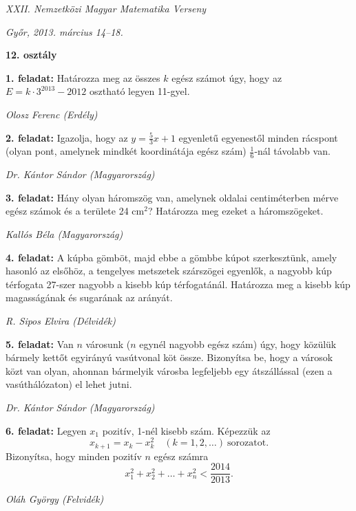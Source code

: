 \documentclass[a4paper,10pt]{article}
\newcommand{\ki}[2]{\hfill {\it #1 (#2)}\medskip}
\begin{document}
\begin{center} \Large {\em XXII. Nemzetközi Magyar Matematika Verseny} \end{center}
\begin{center} \large{\em Győr, 2013. március 14--18.} \end{center}
\smallskip
\begin{center} \large{\bf 12. osztály} \end{center}
\bigskip 

{\bf 1. feladat: } Határozza meg az összes $k$ egész számot úgy, hogy az $E = k\cdot 3^{2013}-2012$ osztható legyen 11-gyel.


\ki{Olosz Ferenc}{Erdély}\medskip

{\bf 2. feladat: } Igazolja, hogy az
$\displaystyle{y=\frac{5}{3}x+1}$
 egyenletű egyenestől minden rácspont (olyan pont, amelynek mindkét koordinátája egész szám) 
 $\displaystyle{\frac{1}{6}}$-nál távolabb van.


\ki{Dr. Kántor Sándor}{Magyarország}\medskip

{\bf 3. feladat: } Hány olyan háromszög van, amelynek oldalai centiméterben mérve egész számok és a
területe 24 cm$^2$? Határozza meg ezeket a háromszögeket.


\ki{Kallós Béla}{Magyarország}\medskip

{\bf 4. feladat: } A kúpba gömböt, majd ebbe a gömbbe kúpot szerkesztünk, amely hasonló az elsőhöz, a
tengelyes metszetek szárszögei egyenlők, a nagyobb kúp térfogata 27-szer nagyobb a
kisebb kúp térfogatánál. Határozza meg a kisebb kúp magasságának és sugarának az
arányát.


\ki{R. Sipos Elvira}{Délvidék}\medskip

{\bf 5. feladat: } Van $n$ városunk ($n$ egynél nagyobb egész szám) úgy, hogy közülük bármely kettőt
egyirányú vasútvonal köt össze. Bizonyítsa be, hogy a városok közt van olyan, ahonnan
bármelyik városba legfeljebb egy átszállással (ezen a vasúthálózaton) el lehet jutni.


\ki{Dr. Kántor Sándor}{Magyarország}\medskip

{\bf 6. feladat: } Legyen $x_1$
pozitív, 1-nél kisebb szám. Képezzük az
$$x_{k+1}=x_k-x_k^2\quad (k=1,2,\ldots)\ \text{sorozatot.}$$
Bizonyítsa, hogy minden pozitív $n$ egész számra
$$x_1^2+x_2^2+\ldots+x_n^2<\frac{2014}{2013}.$$

\ki{Oláh György}{Felvidék}\medskip
\end{document}
